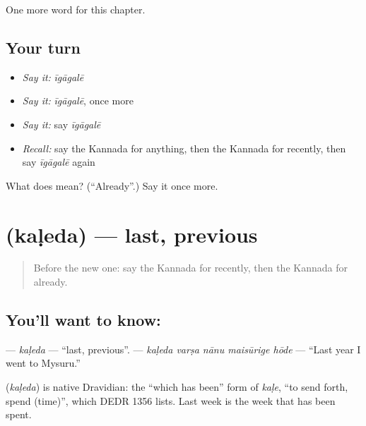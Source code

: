 \begin{grammarlens}[title={What you've built}]
One more word for this chapter.
\end{grammarlens}

\subsection*{Your turn}
\begin{itemize}
\raggedright
  \item \emph{Say it:} \emph{īgāgalē}
  \item \emph{Say it:} \emph{īgāgalē}, once more
  \item \emph{Say it:} say \emph{īgāgalē}
  \item \emph{Recall:} say the Kannada for anything, then the Kannada for recently, then say \emph{īgāgalē} again
\end{itemize}

\begin{tcolorbox}[breakable,colback=teal!4,colframe=teal!35!black,title={Before you move on}]
What does  mean? (\textquotedblleft{}Already\textquotedblright{}.) Say it once more.
\end{tcolorbox}
\section[\texorpdfstring{\kn{ಕಳೆದ} (kaḷeda)}{ಕಳೆದ (kaḷeda)}]{ (kaḷeda) — last, previous}

\label{lesson:KA-C155-kaleda}



\begin{quote}
Before the new one: say the Kannada for recently, then the Kannada for already.
\end{quote}

\subsection*{You'll want to know: }
\textbf{} — \emph{kaḷeda} — \textquotedblleft{}last, previous\textquotedblright{}. \textbf{    } — \emph{kaḷeda varṣa nānu maisūrige hōde} — \textquotedblleft{}Last year I went to Mysuru.\textquotedblright{}

\begin{cousinweb}
\textbf{} (\emph{kaḷeda}) is native Dravidian: the \textquotedblleft{}which has been\textquotedblright{} form of \emph{kaḷe}, \textquotedblleft{}to send forth, spend (time)\textquotedblright{}, which DEDR 1356 lists. Last week is the week that has been spent.
\end{cousinweb}

